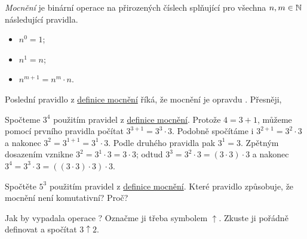 \begin{definition}[Mocnění]
  \label{def:mocneni}
  \emph{Mocnění} je binární operace na přirozených číslech splňující pro všechna
  $n, m \in \mathbb{N}$ následující pravidla.
  \begin{itemize}
    \item $n^{0} = 1$;
    \item $n^{1} = n$;
    \item $n^{m+1} = n^{m} \cdot n$.
  \end{itemize}
\end{definition}
\lessboxspace
\begin{remark}
  Poslední pravidlo z \hyperref[def:mocneni]{definice mocnění} říká, že mocnění
  je opravdu . Přesněji, 
\end{remark}
\begin{example}
  \label{exam:mocneni}
  Spočteme $3^{4}$ použitím pravidel z \hyperref[def:mocneni]{definice mocnění}.
  Protože $4 = 3 + 1$, můžeme pomocí prvního pravidla počítat $3^{3 + 1} = 3^{3}
  \cdot 3$. Podobně spočítáme i $3^{2 + 1} = 3^{2} \cdot 3$ a nakonec $3^{2} =
  3^{1 + 1} = 3^{1} \cdot 3$. Podle druhého pravidla pak $3^{1} = 3$. Zpětným
  dosazením vznikne $3^{2} = 3^{1} \cdot 3 = 3 \cdot 3$; odtud $3^{3} = 3^{2}
  \cdot 3 = (3 \cdot 3) \cdot 3$ a nakonec $3^{4} = 3^{3} \cdot 3 = ((3 \cdot
  3) \cdot 3) \cdot 3$.
\end{example}

\begin{exercise}
  Spočtěte $5^{3}$ použitím pravidel z \hyperref[def:mocneni]{definice mocnění}.
  Které pravidlo způsobuje, že mocnění není komutativní? Proč?
\end{exercise}
\lessboxspace
\begin{hardExercise}
  Jak by vypadala operace ? Označme ji třeba symbolem
  $\uparrow$. Zkuste ji pořádně definovat a spočítat $3 \uparrow 2$.
\end{hardExercise}
